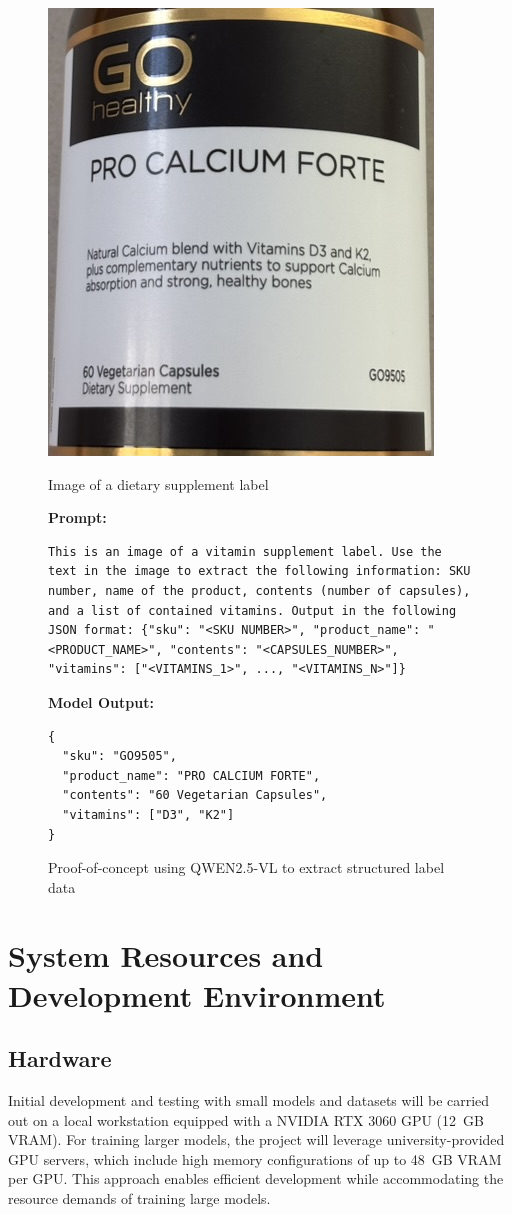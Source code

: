 \documentclass[conference]{IEEEtran}
\begin{document}
\begin{figure}[H]
    \centering
    \includegraphics[width=0.4\linewidth]{label5.JPEG}
    \caption*{\footnotesize Image of a dietary supplement label}

    \textbf{Prompt:}
    \begin{lstlisting}[basicstyle=\ttfamily\scriptsize, frame=single, breaklines=true]
This is an image of a vitamin supplement label. Use the text in the image to extract the following information: SKU number, name of the product, contents (number of capsules), and a list of contained vitamins. Output in the following JSON format: {"sku": "<SKU NUMBER>", "product_name": "<PRODUCT_NAME>", "contents": "<CAPSULES_NUMBER>", "vitamins": ["<VITAMINS_1>", ..., "<VITAMINS_N>"]}
    \end{lstlisting}

    \textbf{Model Output:}
    \begin{lstlisting}[basicstyle=\ttfamily\scriptsize, frame=single, breaklines=true]
{
  "sku": "GO9505",
  "product_name": "PRO CALCIUM FORTE",
  "contents": "60 Vegetarian Capsules",
  "vitamins": ["D3", "K2"]
}
    \end{lstlisting}

    \caption{Proof-of-concept using QWEN2.5-VL to extract structured label data}
    \label{fig:poc}
\end{figure}

\section{System Resources and Development Environment}

\subsection{Hardware}
Initial development and testing with small models and datasets will be carried out on a local workstation equipped with a NVIDIA RTX 3060 GPU (12~GB VRAM). For training larger models, the project will leverage university-provided GPU servers, which include high memory configurations of up to 48~GB VRAM per GPU. This approach enables efficient development while accommodating the resource demands of training large models.
\end{document}
